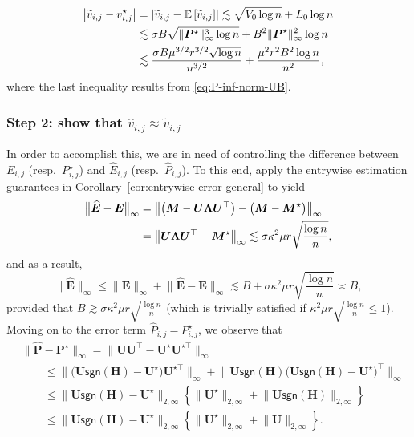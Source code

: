 %
\begin{align}
\big|\widetilde{v}_{i,j}-v_{i,j}^{\star}\big| & =\left|\widetilde{v}_{i,j}-\mathbb{E}\left[\widetilde{v}_{i,j}\right]\right|\lesssim\sqrt{V_{0}\log n}+L_{0}\log n \notag\\
 & \lesssim\sigma B\sqrt{\|\bm{P}^\star \|_{\infty}^{3}\log n}+B^{2}\|\bm{P}^\star \|_{\infty}^{2}\log n \notag\\
 & \lesssim\frac{\sigma B\mu^{3/2}r^{3/2}\sqrt{\log n}}{n^{3/2}}+\frac{\mu^{2}r^{2}B^{2}\log n}{n^{2}} ,
	\label{eq:tilde-v-star-v-diff}
\end{align}
%
where the last inequality results from \eqref{eq:P-inf-norm-UB}. 



\subsubsection{Step 2: show that $\widehat{v}_{i,j}\approx \widetilde{v}_{i,j}$} 
%
In order to accomplish this, we are in need of controlling the difference between $E_{i,j}$ (resp.~$P^\star_{i,j}$) and $\widehat{E}_{i,j}$ (resp.~$\widehat{P}_{i,j}$). 
To this end, apply the entrywise estimation guarantees in Corollary~\ref{cor:entrywise-error-general} to yield
%
\begin{align}
\big\|\widehat{\bm{E}}-\bm{E}\big\|_{\infty} & =\big\|\big(\bm{M}-\bm{U}\bm{\Lambda}\bm{U}^{\top}\big)-\big(\bm{M}-\bm{M}^{\star}\big)\big\|_{\infty} \notag\\
 & =\big\|\bm{U}\bm{\Lambda}\bm{U}^{\top}-\bm{M}^{\star}\big\|_{\infty}\lesssim\sigma\kappa^{2}\mu r\sqrt{\frac{\log n}{n}},
	\label{eq:entrywise-estimation-E}
\end{align}
%
and as a result,
%
\begin{equation}
\big\|\widehat{\bm{E}}\big\|_{\infty}\leq\big\|\bm{E}\big\|_{\infty}+\big\|\widehat{\bm{E}}-\bm{E}\big\|_{\infty}
	\lesssim B+\sigma\kappa^{2}\mu r\sqrt{\frac{\log n}{n}}
	\asymp B,
	\label{eq:entrywise-estimation-E-1}
\end{equation}
%
provided that $B\gtrsim \sigma\kappa^{2}\mu r\sqrt{\frac{\log n}{n}}$ (which is trivially satisfied if $\kappa^{2}\mu r\sqrt{\frac{\log n}{n}}\leq 1$). Moving on to the error term $\widehat{P}_{i,j}-P_{i,j}^\star $, we observe that
%
\begin{align*}
 & \big\|\widehat{\bm{P}}-\bm{P}^\star \big\|_{\infty} =\big\|\bm{U}\bm{U}^{\top}-\bm{U}^{\star}\bm{U}^{\star\top}\big\|_{\infty}\\
 & \qquad \leq\big\|\big(\bm{U}\mathsf{sgn}(\bm{H})-\bm{U}^{\star}\big)\bm{U}^{\star\top}\big\|_{\infty}+\big\|\bm{U}\mathsf{sgn}(\bm{H})\big(\bm{U}\mathsf{sgn}(\bm{H})-\bm{U}^{\star}\big)^{\top}\big\|_{\infty}\\
 & \qquad \leq\big\|\bm{U}\mathsf{sgn}(\bm{H})-\bm{U}^{\star}\big\|_{2,\infty}\left\{ \big\|\bm{U}^{\star}\big\|_{2,\infty}+\big\|\bm{U}\mathsf{sgn}(\bm{H})\big\|_{2,\infty}\right\} \\	
 & \qquad \leq\big\|\bm{U}\mathsf{sgn}(\bm{H})-\bm{U}^{\star}\big\|_{2,\infty}\left\{ \big\|\bm{U}^{\star}\big\|_{2,\infty}+\big\|\bm{U}\big\|_{2,\infty}\right\} .
\end{align*}
